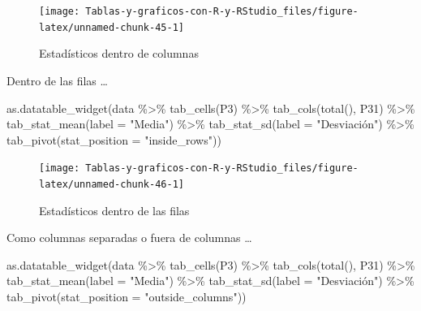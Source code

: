 \documentclass[
]{book}
\newenvironment{Shaded}{\begin{snugshade}}{\end{snugshade}}
\newcommand{\AttributeTok}[1]{\textcolor[rgb]{0.77,0.63,0.00}{#1}}
\newcommand{\FunctionTok}[1]{\textcolor[rgb]{0.00,0.00,0.00}{#1}}
\newcommand{\NormalTok}[1]{#1}
\newcommand{\SpecialCharTok}[1]{\textcolor[rgb]{0.00,0.00,0.00}{#1}}
\newcommand{\StringTok}[1]{\textcolor[rgb]{0.31,0.60,0.02}{#1}}
\begin{document}
\begin{figure}[H]

{\centering \texttt{[image: Tablas-y-graficos-con-R-y-RStudio\_files/figure-latex/unnamed-chunk-45-1]} 

}

\caption{Estadísticos dentro de columnas}\label{fig:unnamed-chunk-45}
\end{figure}

Dentro de las filas \ldots{}

\begin{Shaded}
\begin{Highlighting}[]
\FunctionTok{as.datatable\_widget}\NormalTok{(data }\SpecialCharTok{\%\textgreater{}\%}
  \FunctionTok{tab\_cells}\NormalTok{(P3) }\SpecialCharTok{\%\textgreater{}\%}
  \FunctionTok{tab\_cols}\NormalTok{(}\FunctionTok{total}\NormalTok{(), P31) }\SpecialCharTok{\%\textgreater{}\%}
  \FunctionTok{tab\_stat\_mean}\NormalTok{(}\AttributeTok{label =} \StringTok{"Media"}\NormalTok{) }\SpecialCharTok{\%\textgreater{}\%}
  \FunctionTok{tab\_stat\_sd}\NormalTok{(}\AttributeTok{label =} \StringTok{"Desviación"}\NormalTok{) }\SpecialCharTok{\%\textgreater{}\%}
  \FunctionTok{tab\_pivot}\NormalTok{(}\AttributeTok{stat\_position =} \StringTok{"inside\_rows"}\NormalTok{))}
\end{Highlighting}
\end{Shaded}

\begin{figure}[H]

{\centering \texttt{[image: Tablas-y-graficos-con-R-y-RStudio\_files/figure-latex/unnamed-chunk-46-1]} 

}

\caption{Estadísticos dentro de las filas}\label{fig:unnamed-chunk-46}
\end{figure}

Como columnas separadas o fuera de columnas \ldots{}

\begin{Shaded}
\begin{Highlighting}[]
\FunctionTok{as.datatable\_widget}\NormalTok{(data }\SpecialCharTok{\%\textgreater{}\%}
  \FunctionTok{tab\_cells}\NormalTok{(P3) }\SpecialCharTok{\%\textgreater{}\%}
  \FunctionTok{tab\_cols}\NormalTok{(}\FunctionTok{total}\NormalTok{(), P31) }\SpecialCharTok{\%\textgreater{}\%}
  \FunctionTok{tab\_stat\_mean}\NormalTok{(}\AttributeTok{label =} \StringTok{"Media"}\NormalTok{) }\SpecialCharTok{\%\textgreater{}\%}
  \FunctionTok{tab\_stat\_sd}\NormalTok{(}\AttributeTok{label =} \StringTok{"Desviación"}\NormalTok{) }\SpecialCharTok{\%\textgreater{}\%}
  \FunctionTok{tab\_pivot}\NormalTok{(}\AttributeTok{stat\_position =} \StringTok{"outside\_columns"}\NormalTok{))}
\end{Highlighting}
\end{Shaded}
\end{document}
